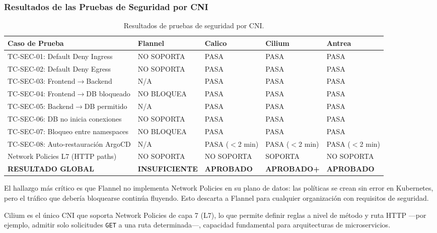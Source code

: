 \subsubsection{Resultados de las Pruebas de Seguridad por CNI}

\begin{table}[htbp]
\centering
\scriptsize
\begin{tabularx}{\textwidth}{|Y|Y|Y|Y|Y|}
\hline
\textbf{Caso de Prueba} & \textbf{Flannel} & \textbf{Calico} & \textbf{Cilium} & \textbf{Antrea} \\
\hline
TC-SEC-01: Default Deny Ingress & NO SOPORTA & PASA & PASA & PASA \\
TC-SEC-02: Default Deny Egress & NO SOPORTA & PASA & PASA & PASA \\
TC-SEC-03: Frontend$\rightarrow$Backend & N/A & PASA & PASA & PASA \\
TC-SEC-04: Frontend$\rightarrow$DB bloqueado & NO BLOQUEA & PASA & PASA & PASA \\
TC-SEC-05: Backend$\rightarrow$DB permitido & N/A & PASA & PASA & PASA \\
TC-SEC-06: DB no inicia conexiones & NO SOPORTA & PASA & PASA & PASA \\
TC-SEC-07: Bloqueo entre namespaces & NO BLOQUEA & PASA & PASA & PASA \\
TC-SEC-08: Auto-restauración ArgoCD & N/A & PASA ($<$2 min) & PASA ($<$2 min) & PASA ($<$2 min) \\
Network Policies L7 (HTTP paths) & NO SOPORTA & NO SOPORTA & SOPORTA & NO SOPORTA \\
\textbf{RESULTADO GLOBAL} & \textbf{INSUFICIENTE} & \textbf{APROBADO} & \textbf{APROBADO+} & \textbf{APROBADO} \\
\hline
\end{tabularx}
\caption{Resultados de pruebas de seguridad por CNI.}
\end{table}

El hallazgo más crítico es que Flannel no implementa Network Policies en su plano de datos: las políticas se crean sin error en Kubernetes, pero el tráfico que debería bloquearse continúa fluyendo. Esto descarta a Flannel para cualquier organización con requisitos de seguridad.

Cilium es el único CNI que soporta Network Policies de capa 7 (L7), lo que permite definir reglas a nivel de método y ruta HTTP ---por ejemplo, admitir solo solicitudes \texttt{GET} a una ruta determinada---, capacidad fundamental para arquitecturas de microservicios.

